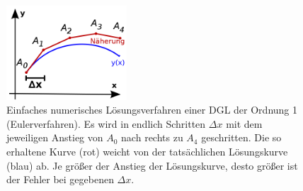 \begin{figure}[ht]
	\centering
	\includegraphics[width=0.4\textwidth]{../pool/ex-ode-slope-field-1-img-b.png}
	\caption{Einfaches numerisches Lösungsverfahren einer DGL der Ordnung 1 (Eulerverfahren). Es wird in endlich Schritten $\Delta x$ mit dem jeweiligen Anstieg von $A_0$ nach rechts zu $A_4$ geschritten. Die so erhaltene Kurve (rot) weicht von der tatsächlichen Lösungskurve (blau) ab. Je größer der Anstieg der Lösungskurve, desto größer ist der Fehler bei gegebenen $\Delta x$.}
	\label{ex-ode-slope-field-1-img-b}
\end{figure}

